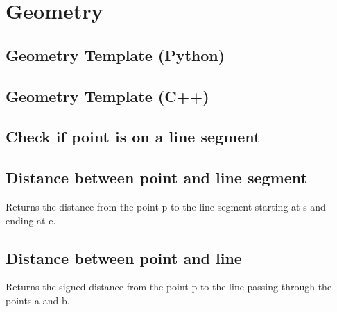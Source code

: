 \documentclass{article}
\begin{document}
\vspace*{-0.5cm}

\section*{Geometry}

\subsection*{Geometry Template (Python)}


\subsection*{Geometry Template (C++)}


\subsection*{Check if point is on a line segment}



\subsection*{Distance between point and line segment}
Returns the distance from the point p to the line segment starting at s and ending at e.
\begin{multicols}{2}
  
  \columnbreak
  
\end{multicols}

\vspace*{-0.5cm}

\subsection*{Distance between point and line}
Returns the signed distance from the point p to the line passing through the points a and b.
\begin{multicols}{2}
  
  \columnbreak
  
\end{multicols}
\end{document}
